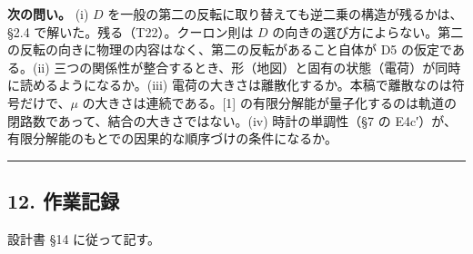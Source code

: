 \documentclass[
  a4paper,
]{ltjsarticle}
\begin{document}
\textbf{次の問い。} (i) \(D\)
を一般の第二の反転に取り替えても逆二乗の構造が残るかは、§2.4
で解いた。残る（T22）。クーロン則は \(D\)
の向きの選び方によらない。第二の反転の向きに物理の内容はなく、第二の反転があること自体が
D5 の仮定である。(ii)
三つの関係性が整合するとき、形（地図）と固有の状態（電荷）が同時に読めるようになるか。(iii)
電荷の大きさは離散化するか。本稿で離散なのは符号だけで、\(\mu\)
の大きさは連続である。{[}1{]}
の有限分解能が量子化するのは軌道の閉路数であって、結合の大きさではない。(iv)
時計の単調性（§7 の
E4c′）が、有限分解能のもとでの因果的な順序づけの条件になるか。

\begin{center}\rule{0.5\linewidth}{0.5pt}\end{center}

\subsection{12. 作業記録}\label{ux4f5cux696dux8a18ux9332}

設計書 §14 に従って記す。
\end{document}
